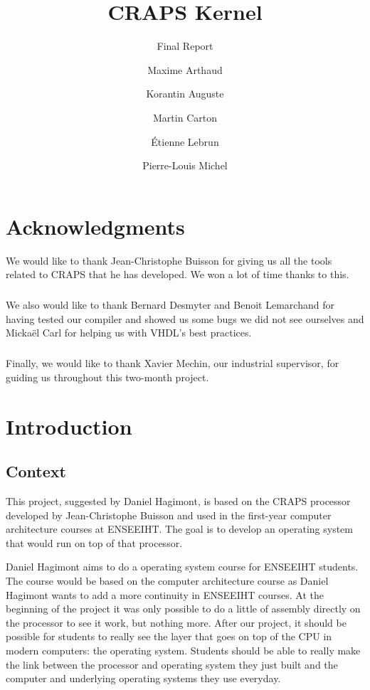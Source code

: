 \documentclass[openany]{book}
\title{CRAPS Kernel}
\subtitle{Final Report}
\author{
       Maxime Arthaud
  \and Korantin Auguste
  \and Martin Carton
  \and Étienne Lebrun
  \and Pierre-Louis Michel
}
\begin{document}
  

  \chapter*{Acknowledgments}
    We would like to thank Jean-Christophe Buisson for giving us all the tools
    related to CRAPS that he has developed. We won a lot of time thanks to this.

    \paragraph{}
    We also would like to thank Bernard Desmyter and Benoit Lemarchand for
    having tested our compiler and showed us some bugs we did not see ourselves
    and Mickaël Carl for helping us with VHDL's best practices.

    \paragraph{}
    Finally, we would like to thank Xavier Mechin, our industrial supervisor,
    for guiding us throughout this two-month project.

  \tableofcontents

  \chapter{Introduction}
    \section{Context}
      This project, suggested by Daniel Hagimont, is based on the CRAPS
      processor developed by Jean-Christophe Buisson and used in the first-year
      computer architecture courses at ENSEEIHT. The goal is to develop an
      operating system that would run on top of that processor.

      Daniel Hagimont aims to do a operating system course for ENSEEIHT
      students. The course would be based on the computer architecture course as
      Daniel Hagimont wants to add a more continuity in ENSEEIHT courses. At the
      beginning of the project it was only possible to do a little of assembly
      directly on the processor to see it work, but nothing more.
      After our project, it should be possible for students to really see
      the layer that goes on top of the CPU in modern computers: the operating
      system. Students should be able to really make the link between the
      processor and operating system they just built and the computer and
      underlying operating systems they use everyday.
\end{document}
